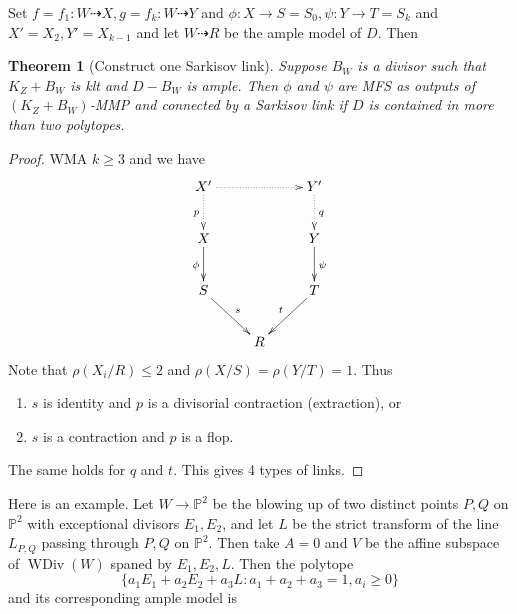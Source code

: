 \documentclass{article}
\newtheorem{thm}[defn]{Theorem}
\begin{document}
Set $ f=f_1:W\dashrightarrow X, g=f_k:W\dashrightarrow Y $ and $ \phi:X\to S=S_0,\psi:Y\to T=S_k $ and $ X'=X_2,Y'=X_{k-1} $ and let $ W\dashrightarrow R $ be the ample model of $ D $. Then
\begin{thm}[Construct one Sarkisov link]\label{constructlink}
  Suppose $ B_W $ is a divisor such that $ K_Z+B_W $ is klt and $ D-B_W $ is ample. Then $ \phi $ and $ \psi $ are MFS as outputs of $ (K_Z+B_W) $-MMP and connected by a Sarkisov link if $ D $ is contained in more than two polytopes.
\end{thm}
\begin{proof}
  WMA $ k\geqslant 3 $ and we have 
  $$ \xymatrix{
  X'\ar@{.>}[d]_p\ar@{.>}[rr]&&Y'\ar@{.>}[d]^q\\
  X\ar[d]_{\phi}&&Y\ar[d]^\psi\\
  S\ar[rd]^s&&T\ar[ld]_t\\
  &R&} $$
Note that $ \rho(X_i/R)\leqslant 2 $ and $ \rho(X/S)=\rho(Y/T)=1 $. Thus 
\begin{enumerate}
  \item $ s $ is identity and $ p $ is a divisorial contraction (extraction), or
  \item $ s $ is a contraction and $ p $ is a flop.
\end{enumerate}
The same holds for $ q $ and $ t $. This gives 4 types of links.
\end{proof}
Here is an example. Let $W \to \mathbb{P}^{2}$ be the blowing up of two distinct points $P,Q$ on $\mathbb{P}^{2}$ with exceptional divisors $E_{1},E_{2}$,  and let  $L$ be the strict transform of the line $L_{P,Q}$ passing through $P,Q $ on $\mathbb{P}^{2}$. Then take $A=0$ and $V$ be the affine subspace of $\operatorname{WDiv}(W)$ spaned by $E_{1},E_{2},L$. Then the polytope
\[
  \{ a_{1}E_{1}+a_{2}E_{2}+a_{3}L: a_{1}+a_{2}+a_{3}=1, a_{i}\geqslant 0  \} 
\]
and its corresponding ample model is 

\end{document}

